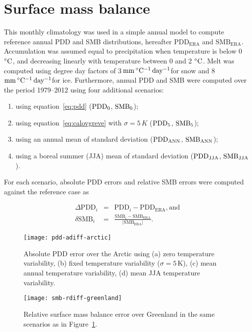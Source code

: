 \documentclass[review]{igs}
\newcommand{\degC}{\,\ensuremath{\rm^\circ C}}
\newcommand{\ddfunit}{\,\ensuremath{\rm mm\,^\circ C^{-1}\,day^{-1}}}
\begin{document}

\section{Surface mass balance}



This monthly climatology was used in a simple annual model to compute reference annual PDD and SMB distributions, hereafter $\mathrm{PDD_{ERA}}$ and $\mathrm{SMB_{ERA}}$. Accumulation was assumed equal to precipitation when temperature is below 0\,\degC, and decreasing linearly with temperature between 0 and 2\,\degC. Melt was computed using degree day factors of 3\ddfunit for snow and 8\ddfunit for ice. Furthermore, annual PDD and SMB were computed over the period 1979--2012 using four additional scenarios:

\begin{enumerate}
  \item using equation~\ref{eq:pdd} ($\rm PDD_0$, $\rm SMB_0$);
  \item using equation~\ref{eq:calovgreve} with $\sigma=5\,K$ ($\rm PDD_5$, $\rm SMB_5$);
  \item using an annual mean of standard deviation ($\rm PDD_{ANN}$, $\rm SMB_{ANN}$);
  \item using a boreal summer (JJA) mean of standard deviation ($\rm PDD_{JJA}$, $\rm SMB_{JJA}$).
\end{enumerate}

For each scenario, absolute PDD errors and relative SMB errors were computed against the reference case as

\begin{eqnarray}
  \Delta\mathrm{PDD}_i &=& \mathrm{PDD}_i - \mathrm{PDD_{ERA}}, \mathrm{and}\\
  \delta\mathrm{SMB}_i &=& \frac{\mathrm{SMB}_i - \mathrm{SMB_{ERA}}}{|\mathrm{SMB_{ERA}}|}.
\end{eqnarray}

\begin{figure}
  \centering\texttt{[image: pdd-adiff-arctic]}
  \caption{Absolute PDD error over the Arctic using (a) zero temperature variability, (b) fixed temperature variability ($\sigma=5\,\mathrm{K}$), (c) mean annual temperature variability, (d) mean JJA temperature variability.}
  \label{fig:pdd}
\end{figure}

\begin{figure}
  \centering\texttt{[image: smb-rdiff-greenland]}
  \caption{Relative surface mass balance error over Greenland in the same scenarios as in Figure~\ref{fig:pdd}.}
  \label{fig:smb}
\end{figure}
\end{document}
